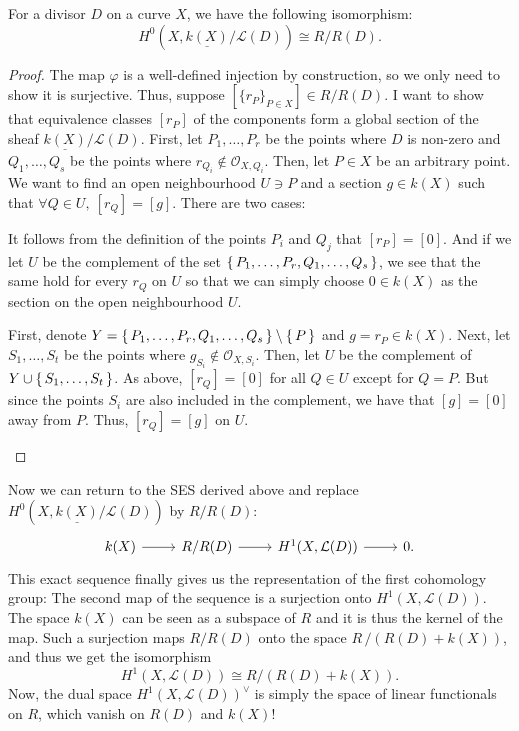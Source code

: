 \begin{lemm}
  For a divisor $D$ on a curve $X$, we have the following isomorphism:
  \[
    H^{0}(X,\underline{k(X)}/\mathcal{L}(D))\cong R/R(D).
  \]
\end{lemm}
\begin{proof}
  The map $\varphi$ is a well-defined injection by construction,
  so we only need to show it is surjective. Thus,
  suppose $[\{r_{P}\}_{P\in X}]\in R/R(D)$. I want to show that equivalence
  classes $[r_{P}]$ of the components form a global section of the sheaf
  $\underline{k(X)}/\mathcal{L}(D)$. First, let $P_{1},\ldots,P_{r}$
  be the points where $D$ is non-zero and $Q_{1},\ldots,Q_{s}$ be the
  points where $r_{Q_{i}}\not\in \mathscr{O}_{X,Q_{i}}$. Then, let $P\in X$
  be an arbitrary point. We want to find an open neighbourhood $U\ni P$
  and a section $g\in k(X)$ such that $\forall Q\in U,\ [r_{Q}]=[g]$.
  There are two cases:
  \begin{description}[style=nextline]
    \item[$P\not\in\set{P_{1},\ldots,P_{r},Q_{1},\ldots,Q_{s}}\big)$]
          It follows from the definition of the points $P_{i}$ and $Q_{j}$
          that $[r_{P}]=[0]$. And if we let $U$ be the complement of
          the set $\set{P_{1},\ldots,P_{r},Q_{1},\ldots,Q_{s}}$, we see
          that the same hold for every $r_{Q}$ on $U$ so that we can simply
          choose $0\in k(X)$ as the section on the open neighbourhood $U$.
    \item[$P\in\set{P_{1},\ldots,P_{r},Q_{1},\ldots,Q_{s}}\big)$]
          First, denote $Y=\set{P_{1},\ldots,P_{r},Q_{1},\ldots,Q_{s}}
          \setminus \set{P}$ and $g=r_{P}\in k(X)$. Next, let
          $S_{1},\ldots,S_{t}$ be the points where
          $g_{S_{i}}\not\in\mathscr{O}_{X,S_{i}}$. Then, let $U$ be
          the complement of $Y\cup \set{S_{1},\ldots,S_{t}}$. As above,
          $[r_{Q}]=[0]$ for all $Q\in U$ except for $Q=P$. But since
          the points $S_{i}$ are also included in the complement, we have
          that $[g]=[0]$ away from $P$. Thus, $[r_{Q}]=[g]$ on $U$.
  \end{description}
\end{proof}
Now we can return to the SES derived above and replace
$H^{0}(X,\underline{k(X)}/\mathcal{L}(D))$ by $R/R(D)$:
\[
  \begin{tikzcd}
    k(X)\arrow{r} & R/R(D)\arrow{r} & H^{1}(X,\mathcal{L}(D))\arrow{r} & 0.
  \end{tikzcd}
\]
This exact sequence finally gives us the representation of the first
cohomology group: The second map of the sequence is a surjection
onto $H^{1}(X,\mathcal{L}(D))$. The space $k(X)$ can be seen as a subspace
of $R$ and it is thus the kernel of the map. Such a surjection maps $R/R(D)$
onto the space $R\,/\left(R(D)+k(X)\right)$, and thus we get the isomorphism
\[H^{1}(X,\mathcal{L}(D))\cong R/\left(R(D)+k(X)\right).\]
Now, the dual space $H^{1}(X,\mathcal{L}(D))^{\vee}$ is simply the space
of linear functionals on $R$, which vanish on $R(D)$ and $k(X)$!

